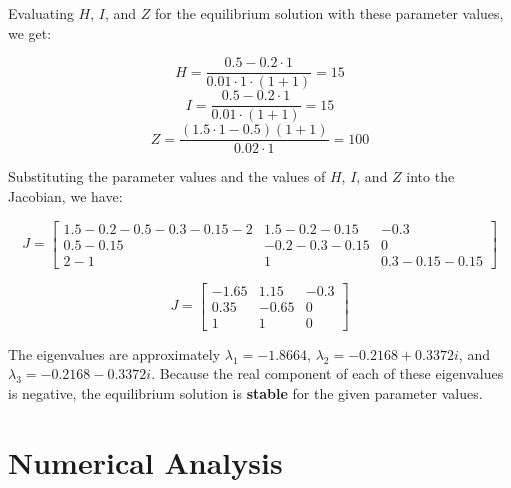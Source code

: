 \documentclass[
	12pt
]{article}
\begin{document}
Evaluating $H$, $I$, and $Z$ for the equilibrium solution with these parameter values, we get:

\begin{equation}
    H = \frac{0.5-0.2\cdot1}{0.01\cdot1\cdot(1+1)} = 15
\end{equation}
\begin{equation}
    I = \frac{0.5-0.2\cdot1}{0.01\cdot(1+1)} = 15
\end{equation}
\begin{equation}
    Z = \frac{(1.5\cdot1-0.5)(1+1)}{0.02\cdot1} = 100
\end{equation}

Substituting the parameter values and the values of $H$, $I$, and $Z$ into the Jacobian, we have:

$$
J=\begin{bmatrix} 1.5-0.2-0.5-0.3-0.15-2 & 1.5-0.2-0.15 & -0.3 \\ 0.5 - 0.15 & -0.2-0.3-0.15 & 0 \\ 2-1 & 1 & 0.3-0.15-0.15 \end{bmatrix}
$$

$$
J=\begin{bmatrix} -1.65 & 1.15 & -0.3 \\ 0.35 & -0.65 & 0 \\ 1 & 1 & 0 \end{bmatrix}
$$

The eigenvalues are approximately $\lambda_1=-1.8664$, $\lambda_2=-0.2168+0.3372i$, and $\lambda_3=-0.2168-0.3372i$. Because the real component of each of these eigenvalues is negative, the equilibrium solution is \textbf{stable} for the given parameter values.

\section{Numerical Analysis}
\end{document}
